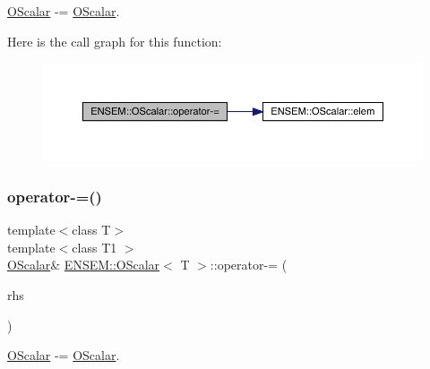 \mbox{\hyperlink{classENSEM_1_1OScalar}{O\+Scalar}} -\/= \mbox{\hyperlink{classENSEM_1_1OScalar}{O\+Scalar}}. 

Here is the call graph for this function\+:
\nopagebreak
\begin{figure}[H]
\begin{center}
\leavevmode
\includegraphics[width=350pt]{da/d80/classENSEM_1_1OScalar_a4d240e95768b5a0c9537b32d00d60ac5_cgraph}
\end{center}
\end{figure}
\mbox{\label{classENSEM_1_1OScalar_a4d240e95768b5a0c9537b32d00d60ac5}} 
\subsubsection{\texorpdfstring{operator-\/=()}{operator-=()}\hspace{0.1cm}{\footnotesize\ttfamily [2/2]}}
{\footnotesize\ttfamily template$<$class T$>$ \\
template$<$class T1 $>$ \\
\mbox{\hyperlink{classENSEM_1_1OScalar}{O\+Scalar}}\& \mbox{\hyperlink{classENSEM_1_1OScalar}{E\+N\+S\+E\+M\+::\+O\+Scalar}}$<$ T $>$\+::operator-\/= (\begin{DoxyParamCaption}\item[{const \mbox{\hyperlink{classENSEM_1_1OScalar}{O\+Scalar}}$<$ T1 $>$ \&}]{rhs }\end{DoxyParamCaption})\hspace{0.3cm}{\ttfamily [inline]}}



\mbox{\hyperlink{classENSEM_1_1OScalar}{O\+Scalar}} -\/= \mbox{\hyperlink{classENSEM_1_1OScalar}{O\+Scalar}}. 

